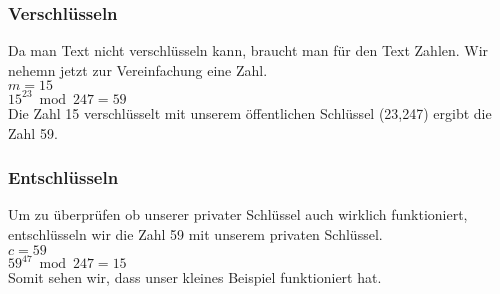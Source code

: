 \subsubsection{Verschlüsseln}
Da man Text nicht verschlüsseln kann, braucht man für den Text Zahlen. Wir nehemn jetzt zur Vereinfachung eine Zahl.\\
$ m = 15 $ \\
$ 15^{23} \bmod 247 = 59$ \\
Die Zahl 15 verschlüsselt mit unserem öffentlichen Schlüssel (23,247) ergibt die Zahl 59.
\subsubsection{Entschlüsseln}
Um zu überprüfen ob unserer privater Schlüssel auch wirklich funktioniert, entschlüsseln wir die Zahl 59 mit unserem privaten Schlüssel.\\
$ c = 59 $ \\
$ 59^{47} \bmod 247 = 15$ \\
Somit sehen wir, dass unser kleines Beispiel funktioniert hat.
